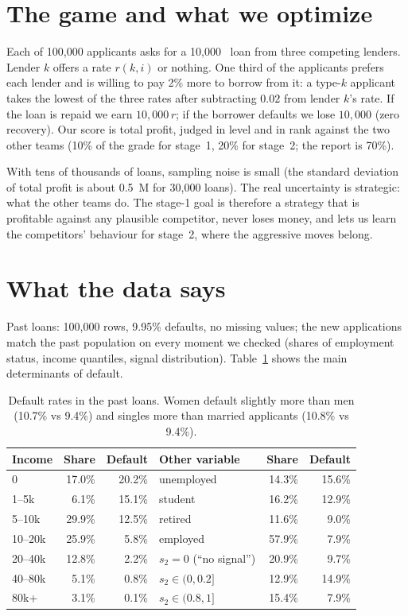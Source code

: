 \documentclass[11pt,a4paper]{article}
\newcommand{\meur}{M\texteuro}
\begin{document}
\section{The game and what we optimize}
Each of 100,000 applicants asks for a 10,000~\texteuro{} loan from three competing lenders. Lender $k$ offers a rate
$r(k,i)$ or nothing. One third of the applicants prefers each lender and is willing to pay 2\% more to borrow from
it: a type-$k$ applicant takes the lowest of the three rates after subtracting $0.02$ from lender $k$'s rate.
If the loan is repaid we earn $10{,}000\,r$; if the borrower defaults we lose $10{,}000$ (zero recovery).
Our score is total profit, judged in level and in rank against the two other teams (10\% of the grade for
stage~1, 20\% for stage~2; the report is 70\%).

With tens of thousands of loans, sampling noise is small (the standard deviation of total profit is about
0.5~\meur{} for 30,000 loans). The real uncertainty is strategic: what the other teams do. The stage-1 goal is
therefore a strategy that is profitable against any plausible competitor, never loses money, and lets us learn
the competitors' behaviour for stage~2, where the aggressive moves belong.

\section{What the data says}
Past loans: 100,000 rows, 9.95\% defaults, no missing values; the new applications match the past population on
every moment we checked (shares of employment status, income quantiles, signal distribution). Table~\ref{tab:data}
shows the main determinants of default.

\begin{table}[h]\centering\small
\begin{tabular}{lrr@{\hskip 1.2cm}lrr}
\toprule
Income & Share & Default & Other variable & Share & Default\\
\midrule
0           & 17.0\% & 20.2\% & unemployed & 14.3\% & 15.6\%\\
1--5k       &  6.1\% & 15.1\% & student    & 16.2\% & 12.9\%\\
5--10k      & 29.9\% & 12.5\% & retired    & 11.6\% &  9.0\%\\
10--20k     & 25.9\% &  5.8\% & employed   & 57.9\% &  7.9\%\\
20--40k     & 12.8\% &  2.2\% & $s_2 = 0$ (``no signal'') & 20.9\% & 9.7\%\\
40--80k     &  5.1\% &  0.8\% & $s_2 \in (0, 0.2]$   & 12.9\% & 14.9\%\\
80k+        &  3.1\% &  0.1\% & $s_2 \in (0.8, 1]$   & 15.4\% &  7.9\%\\
\bottomrule
\end{tabular}
\caption{Default rates in the past loans. Women default slightly more than men (10.7\% vs 9.4\%) and singles more
than married applicants (10.8\% vs 9.4\%).}
\label{tab:data}
\end{table}
\end{document}
